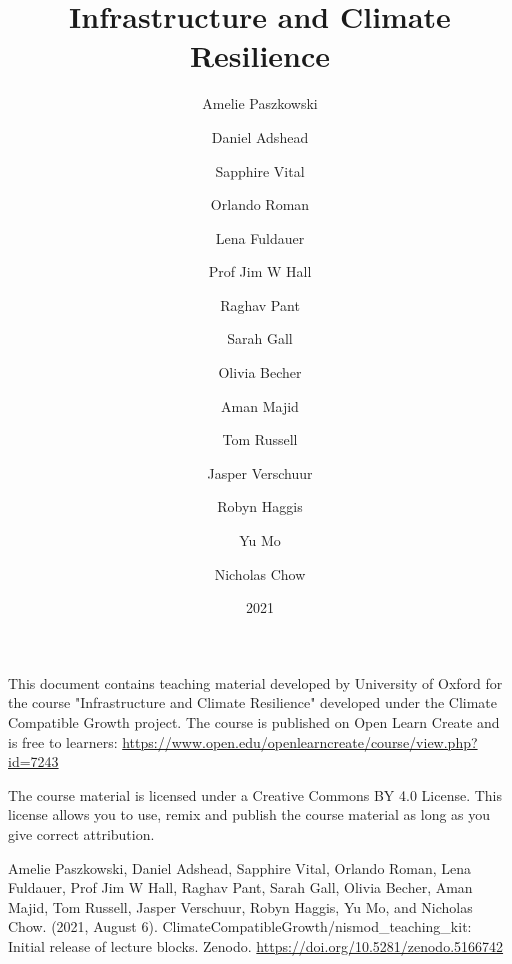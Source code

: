 \documentclass{article}
\title{Infrastructure and Climate Resilience}
\author{
    Amelie Paszkowski
    \and
    Daniel Adshead
    \and
    Sapphire Vital
    \and
    Orlando Roman
    \and
    Lena Fuldauer
    \and
    Prof Jim W Hall
    \and
    Raghav Pant
    \and
    Sarah Gall
    \and
    Olivia Becher
    \and
    Aman Majid
    \and
    Tom Russell
    \and
    Jasper Verschuur
    \and
    Robyn Haggis
    \and
    Yu Mo
    \and
    Nicholas Chow
}
\date{2021}
\begin{document}
\maketitle

This document contains teaching material developed by University of Oxford for
the course "Infrastructure and Climate Resilience" developed under the Climate
Compatible Growth project. The course is published on Open Learn Create and is
free to learners:
\url{https://www.open.edu/openlearncreate/course/view.php?id=7243}

The course material is licensed under a Creative Commons BY 4.0 License. This
license allows you to use, remix and publish the course material as long as you
give correct attribution.

Amelie Paszkowski, Daniel Adshead, Sapphire Vital, Orlando Roman, Lena Fuldauer,
Prof Jim W Hall, Raghav Pant, Sarah Gall, Olivia Becher, Aman Majid, Tom
Russell, Jasper Verschuur, Robyn Haggis, Yu Mo, and Nicholas Chow. (2021, August
6). ClimateCompatibleGrowth/nismod\_teaching\_kit: Initial release of lecture
blocks. Zenodo. \url{https://doi.org/10.5281/zenodo.5166742}

\tableofcontents
\end{document}
